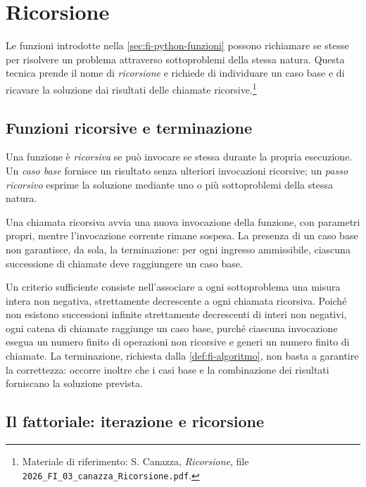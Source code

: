 \chapter{Ricorsione}
\label{chap:ricorsione}

Le funzioni introdotte nella \cref{sec:fi-python-funzioni} possono
richiamare se stesse per risolvere un problema attraverso sottoproblemi
della stessa natura. Questa tecnica prende il nome di \emph{ricorsione}
e richiede di individuare un caso base e di ricavare la soluzione dai
risultati delle chiamate ricorsive.\footnote{Materiale
di riferimento: S. Canazza, \emph{Ricorsione}, file
\nolinkurl{2026_FI_03_canazza_Ricorsione.pdf}.}

\section{Funzioni ricorsive e terminazione}
\label{sec:fi-ricorsione-terminazione}

\begin{definition}[Ricorsione]
Una funzione è \emph{ricorsiva} se può invocare se stessa durante la
propria esecuzione. Un \emph{caso base} fornisce un risultato senza
ulteriori invocazioni ricorsive; un \emph{passo ricorsivo} esprime la
soluzione mediante uno o più sottoproblemi della stessa natura.
\end{definition}

Una chiamata ricorsiva avvia una nuova invocazione della funzione, con
parametri propri, mentre l'invocazione corrente rimane sospesa.
La presenza di un caso base non garantisce, da sola, la terminazione:
per ogni ingresso ammissibile, ciascuna successione di chiamate deve
raggiungere un caso base.

Un criterio sufficiente consiste nell'associare a ogni sottoproblema
una misura intera non negativa, strettamente decrescente a ogni
chiamata ricorsiva. Poiché non esistono successioni infinite strettamente
decrescenti di interi non negativi, ogni catena di chiamate raggiunge
un caso base, purché ciascuna invocazione esegua un numero finito
di operazioni non ricorsive e generi un numero finito di chiamate.
La terminazione, richiesta dalla \cref{def:fi-algoritmo}, non basta
a garantire la correttezza: occorre inoltre che i casi base e la
combinazione dei risultati forniscano la soluzione prevista.

\section{Il fattoriale: iterazione e ricorsione}
\label{sec:fi-fattoriale}

